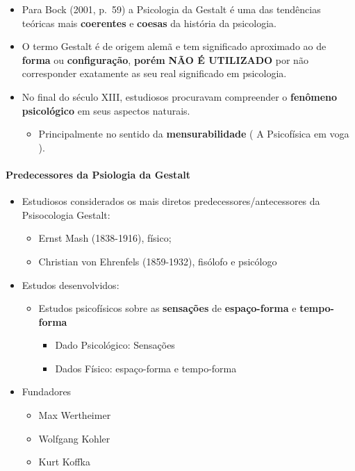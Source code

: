 \documentclass[
]{book}
\providecommand{\tightlist}{%
  \setlength{\itemsep}{0pt}\setlength{\parskip}{0pt}}
\begin{document}
\begin{itemize}
\tightlist
\item
  Para Bock (2001, p.~59) a Psicologia da Gestalt é uma das tendências teóricas mais \textbf{coerentes} e \textbf{coesas} da história da psicologia.
\item
  O termo Gestalt é de origem alemã e tem significado aproximado ao de \textbf{forma} ou \textbf{configuração}, \textbf{porém} \textbf{NÃO É UTILIZADO} por não corresponder exatamente as seu real significado em psicologia.
\item
  No final do século XIII, estudiosos procuravam compreender o \textbf{fenômeno psicológico} em seus aspectos naturais.

  \begin{itemize}
  \tightlist
  \item
    Principalmente no sentido da \textbf{mensurabilidade} ( A Psicofísica em voga ).
  \end{itemize}
\end{itemize}

\hypertarget{predecessores-da-psiologia-da-gestalt}{%
\paragraph{Predecessores da Psiologia da Gestalt}\label{predecessores-da-psiologia-da-gestalt}}

\begin{itemize}
\tightlist
\item
  Estudiosos considerados os mais diretos predecessores/antecessores da Psisocologia Gestalt:

  \begin{itemize}
  \tightlist
  \item
    Ernst Mash (1838-1916), físico;
  \item
    Christian von Ehrenfels (1859-1932), fisólofo e psicólogo
  \end{itemize}
\item
  Estudos desenvolvidos:

  \begin{itemize}
  \tightlist
  \item
    Estudos psicofísicos sobre as \textbf{sensações} de \textbf{espaço-forma} e \textbf{tempo-forma}

    \begin{itemize}
    \tightlist
    \item
      Dado Psicológico: Sensações
    \item
      Dados Físico: espaço-forma e tempo-forma
    \end{itemize}
  \end{itemize}
\item
  Fundadores

  \begin{itemize}
  \tightlist
  \item
    Max Wertheimer
  \item
    Wolfgang Kohler
  \item
    Kurt Koffka
  \end{itemize}
\end{itemize}
\end{document}
